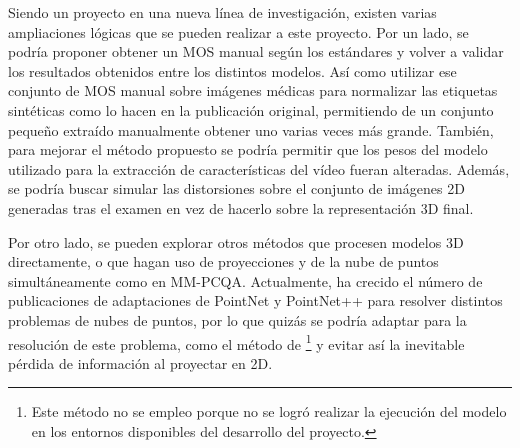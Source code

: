 Siendo un proyecto en una nueva línea de investigación, existen varias ampliaciones 
lógicas que se pueden realizar a este proyecto. Por un lado, se podría proponer 
obtener un MOS manual según los estándares y volver a validar los resultados obtenidos
entre los distintos modelos. Así como utilizar ese conjunto de MOS manual sobre imágenes médicas 
para normalizar las etiquetas sintéticas como lo hacen en la publicación original, 
permitiendo de un conjunto pequeño extraído manualmente obtener uno varias 
veces más grande. También, para mejorar el método propuesto se podría permitir 
que los pesos del modelo utilizado para la extracción de características 
del vídeo fueran alteradas. Además, se podría buscar simular las distorsiones 
sobre el conjunto de imágenes 2D generadas tras el examen en vez de hacerlo 
sobre la representación 3D final. 

Por otro lado, se pueden explorar otros métodos que procesen modelos 3D directamente, 
o que hagan uso de proyecciones y de la nube de puntos simultáneamente como en MM-PCQA\cite{MM-PCQA}.
Actualmente, ha crecido el número de publicaciones de adaptaciones de PointNet\cite{PointNet} y 
PointNet++\cite{PointNet++} para resolver distintos problemas de nubes de puntos, 
por lo que quizás se podría adaptar para la resolución de este problema, como 
el método de \cite{ResSCNN}\footnote{Este método no se empleo porque no se 
logró realizar la ejecución del modelo en los entornos disponibles 
del desarrollo del proyecto.} y evitar así 
la inevitable pérdida de información al proyectar en 2D.


